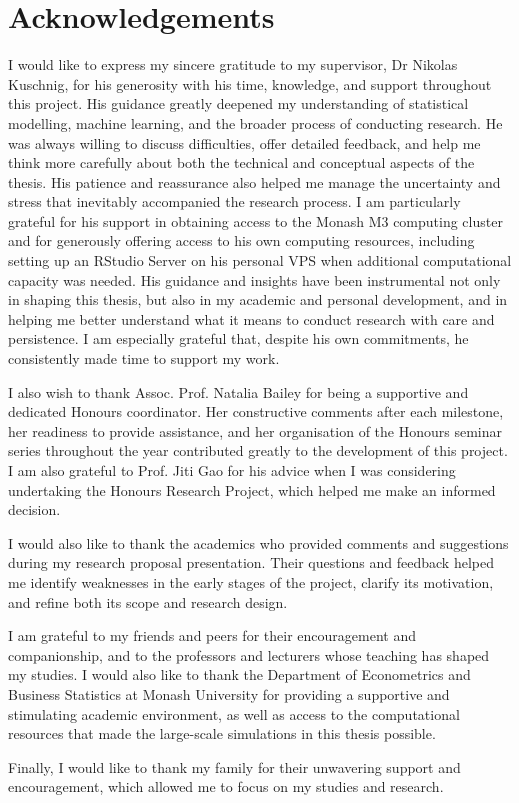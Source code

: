 \documentclass[../main.tex]{subfiles}
\begin{document}
	
\section*{Acknowledgements}

I would like to express my sincere gratitude to my supervisor, Dr Nikolas Kuschnig, for his generosity with his time, knowledge, and support throughout this project. His guidance greatly deepened my understanding of statistical modelling, machine learning, and the broader process of conducting research. He was always willing to discuss difficulties, offer detailed feedback, and help me think more carefully about both the technical and conceptual aspects of the thesis. His patience and reassurance also helped me manage the uncertainty and stress that inevitably accompanied the research process. I am particularly grateful for his support in obtaining access to the Monash M3 computing cluster and for generously offering access to his own computing resources, including setting up an RStudio Server on his personal VPS when additional computational capacity was needed. His guidance and insights have been instrumental not only in shaping this thesis, but also in my academic and personal development, and in helping me better understand what it means to conduct research with care and persistence. I am especially grateful that, despite his own commitments, he consistently made time to support my work.

I also wish to thank Assoc. Prof. Natalia Bailey for being a supportive and dedicated Honours coordinator. Her constructive comments after each milestone, her readiness to provide assistance, and her organisation of the Honours seminar series throughout the year contributed greatly to the development of this project. I am also grateful to Prof. Jiti Gao for his advice when I was considering undertaking the Honours Research Project, which helped me make an informed decision.

I would also like to thank the academics who provided comments and suggestions during my research proposal presentation. Their questions and feedback helped me identify weaknesses in the early stages of the project, clarify its motivation, and refine both its scope and research design.

I am grateful to my friends and peers for their encouragement and companionship, and to the professors and lecturers whose teaching has shaped my studies. I would also like to thank the Department of Econometrics and Business Statistics at Monash University for providing a supportive and stimulating academic environment, as well as access to the computational resources that made the large-scale simulations in this thesis possible.

Finally, I would like to thank my family for their unwavering support and encouragement, which allowed me to focus on my studies and research.
\end{document}
